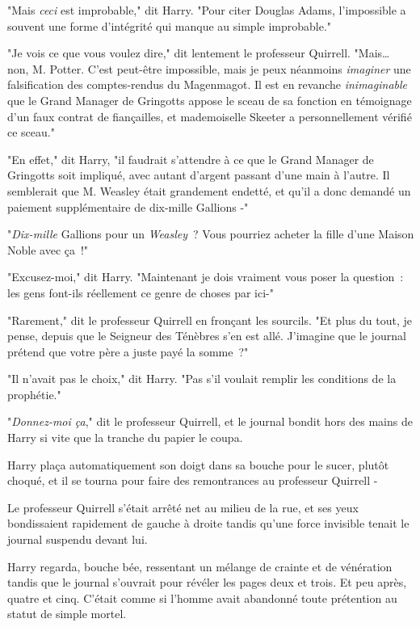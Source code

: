 "Mais \emph{ceci} est improbable," dit Harry. "Pour citer Douglas Adams, l'impossible a souvent une forme d'intégrité qui manque au simple improbable."

"Je vois ce que vous voulez dire," dit lentement le professeur Quirrell. "Mais… non, M. Potter. C'est peut-être impossible, mais je peux néanmoins \emph{imaginer} une falsification des comptes-rendus du Magenmagot. Il est en revanche \emph{inimaginable} que le Grand Manager de Gringotts appose le sceau de sa fonction en témoignage d'un faux contrat de fiançailles, et mademoiselle Skeeter a personnellement vérifié ce sceau."

"En effet," dit Harry, "il faudrait s'attendre à ce que le Grand Manager de Gringotts soit impliqué, avec autant d'argent passant d'une main à l'autre. Il semblerait que M. Weasley était grandement endetté, et qu'il a donc demandé un paiement supplémentaire de dix-mille Gallions -"

"\emph{Dix-mille} Gallions pour un \emph{Weasley}~? Vous pourriez acheter la fille d'une Maison Noble avec ça~!"

"Excusez-moi," dit Harry. "Maintenant je dois vraiment vous poser la question~: les gens font-ils réellement ce genre de choses par ici-"

"Rarement," dit le professeur Quirrell en fronçant les sourcils. "Et plus du tout, je pense, depuis que le Seigneur des Ténèbres s'en est allé. J'imagine que le journal prétend que votre père a juste payé la somme~?"

"Il n'avait pas le choix," dit Harry. "Pas s'il voulait remplir les conditions de la prophétie."

"\emph{Donnez-moi ça}," dit le professeur Quirrell, et le journal bondit hors des mains de Harry si vite que la tranche du papier le coupa.

Harry plaça automatiquement son doigt dans sa bouche pour le sucer, plutôt choqué, et il se tourna pour faire des remontrances au professeur Quirrell -

Le professeur Quirrell s'était arrêté net au milieu de la rue, et ses yeux bondissaient rapidement de gauche à droite tandis qu'une force invisible tenait le journal suspendu devant lui.

Harry regarda, bouche bée, ressentant un mélange de crainte et de vénération tandis que le journal s'ouvrait pour révéler les pages deux et trois. Et peu après, quatre et cinq. C'était comme si l'homme avait abandonné toute prétention au statut de simple mortel.

